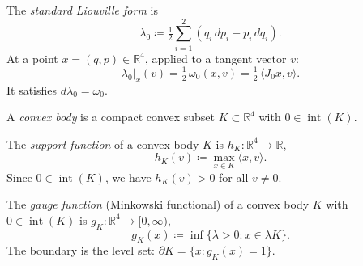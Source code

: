 \begin{definition}\label{def:liouville-form}
The \emph{standard Liouville form} is
\[
  \lambda_0 \coloneqq \tfrac{1}{2} \sum_{i=1}^{2} (q_i \, dp_i - p_i \, dq_i).
\]
At a point $x = (q, p) \in \mathbb{R}^4$, applied to a tangent vector $v$:
\[
  \lambda_0|_x(v) = \tfrac{1}{2}\, \omega_0(x, v) = \tfrac{1}{2}\, \langle J_0 x, v \rangle.
\]
It satisfies $d\lambda_0 = \omega_0$.
\end{definition}


\begin{definition}\label{def:convex-body}
A \emph{convex body} is a compact convex subset $K \subset \mathbb{R}^4$
with $0 \in \operatorname{int}(K)$.
\end{definition}

\begin{definition}\label{def:support-function}
The \emph{support function} of a convex body $K$ is $h_K \colon \mathbb{R}^4 \to \mathbb{R}$,
\[
  h_K(v) \coloneqq \max_{x \in K} \langle x, v \rangle.
\]
Since $0 \in \operatorname{int}(K)$, we have $h_K(v) > 0$ for all $v \neq 0$.
\end{definition}

\begin{definition}\label{def:gauge-function}
The \emph{gauge function} (Minkowski functional) of a convex body $K$ with
$0 \in \operatorname{int}(K)$ is $g_K \colon \mathbb{R}^4 \to [0,\infty)$,
\[
  g_K(x) \coloneqq \inf\{ \lambda > 0 : x \in \lambda K \}.
\]
The boundary is the level set: $\partial K = \{x : g_K(x) = 1\}$.
\end{definition}

